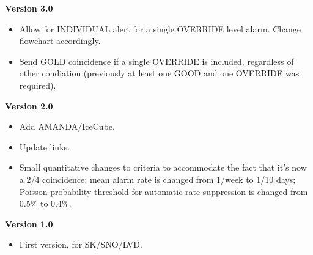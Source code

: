 \documentclass{article}
\begin{document}
\noindent
\textbf{Version 3.0}
\begin{itemize}
\item Allow for INDIVIDUAL alert for a single OVERRIDE level alarm.   Change
flowchart accordingly.

\item Send GOLD coincidence if a single OVERRIDE is included,
regardless of other condiation (previously at least
one GOOD and one OVERRIDE was required).
\end{itemize}

\noindent
\textbf{Version 2.0}
\begin{itemize}
\item Add AMANDA/IceCube.
\item Update links.
\item Small quantitative changes to criteria to accommodate the fact that it's
now a 2/4 coincidence:  mean alarm rate is changed from 1/week to 1/10
days; Poisson probability threshold for automatic rate suppression 
is changed from 0.5\% to 0.4\%.  
\end{itemize}

\noindent
\textbf{Version 1.0}
\begin{itemize}
\item First version, for SK/SNO/LVD.
\end{itemize}
\end{document}
